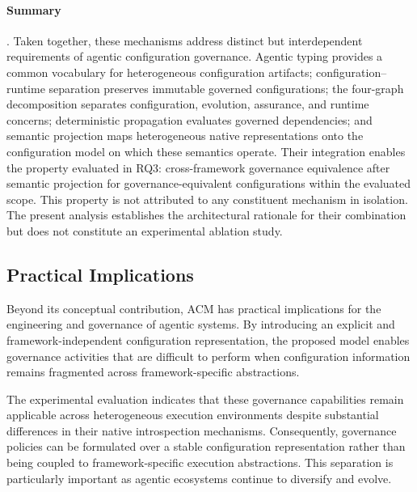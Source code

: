 \documentclass[10pt]{article}
\begin{document}
\paragraph{Summary}. Taken together, these mechanisms address distinct but interdependent requirements of agentic configuration governance. Agentic typing provides a common vocabulary for heterogeneous configuration artifacts; configuration--runtime separation preserves immutable governed configurations; the four-graph decomposition separates configuration, evolution, assurance, and runtime concerns; deterministic propagation evaluates governed dependencies;
and semantic projection maps heterogeneous native representations onto the configuration model on which these semantics operate. Their integration enables the property evaluated in RQ3: cross-framework governance equivalence after semantic projection for governance-equivalent configurations within the evaluated scope. This property is not attributed to any constituent mechanism in isolation. The present analysis establishes the architectural rationale for
their combination but does not constitute an experimental ablation study.


\subsection{Practical Implications}
\label{sec:practical_implications}

Beyond its conceptual contribution, ACM has practical implications for the engineering and governance of agentic systems. By introducing an explicit and framework-independent configuration representation, the proposed model enables governance activities that are difficult to perform when configuration information remains fragmented across framework-specific abstractions.

The experimental evaluation indicates that these governance capabilities remain applicable across heterogeneous execution environments despite substantial differences in their native introspection mechanisms. Consequently, governance policies can be formulated over a stable configuration representation rather than being coupled to framework-specific execution abstractions. This separation is particularly important as agentic ecosystems continue to diversify and evolve.
\end{document}
